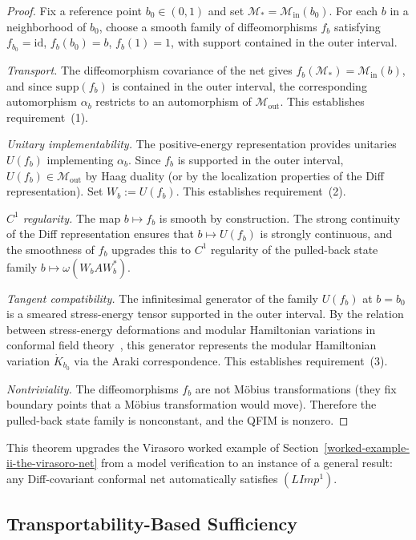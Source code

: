 \documentclass[12pt]{article}
\theoremstyle{definition}
\theoremstyle{remark}
\begin{document}
\begin{proof}
Fix a reference point $b_0 \in (0,1)$ and set $\mathcal{M}_* = \mathcal{M}_{\mathrm{in}}(b_0)$. For each $b$ in a neighborhood of $b_0$, choose a smooth family of diffeomorphisms $f_b$ satisfying $f_{b_0} = \mathrm{id}$, $f_b(b_0) = b$, $f_b(1) = 1$, with support contained in the outer interval.

\emph{Transport.} The diffeomorphism covariance of the net gives $f_b(\mathcal{M}_*) = \mathcal{M}_{\mathrm{in}}(b)$, and since $\mathrm{supp}(f_b)$ is contained in the outer interval, the corresponding automorphism $\alpha_b$ restricts to an automorphism of $\mathcal{M}_{\mathrm{out}}$. This establishes requirement~(1).

\emph{Unitary implementability.} The positive-energy representation provides unitaries $U(f_b)$ implementing $\alpha_b$. Since $f_b$ is supported in the outer interval, $U(f_b) \in \mathcal{M}_{\mathrm{out}}$ by Haag duality (or by the localization properties of the Diff representation). Set $W_b := U(f_b)$. This establishes requirement~(2).

\emph{$C^1$ regularity.} The map $b \mapsto f_b$ is smooth by construction. The strong continuity of the Diff representation ensures that $b \mapsto U(f_b)$ is strongly continuous, and the smoothness of $f_b$ upgrades this to $C^1$ regularity of the pulled-back state family $b \mapsto \omega(W_b A W_b^*)$.

\emph{Tangent compatibility.} The infinitesimal generator of the family $U(f_b)$ at $b = b_0$ is a smeared stress-energy tensor supported in the outer interval. By the relation between stress-energy deformations and modular Hamiltonian variations in conformal field theory~\cite{CasiniHuertaMyers2011}, this generator represents the modular Hamiltonian variation $\dot{K}_{b_0}$ via the Araki correspondence. This establishes requirement~(3).

\emph{Nontriviality.} The diffeomorphisms $f_b$ are not Möbius transformations (they fix boundary points that a Möbius transformation would move). Therefore the pulled-back state family is nonconstant, and the QFIM is nonzero.
\end{proof}

This theorem upgrades the Virasoro worked example of Section~\ref{worked-example-ii-the-virasoro-net} from a model verification to an instance of a general result: any Diff-covariant conformal net automatically satisfies $(LImp^1)$.

\subsection{Transportability-Based Sufficiency}\label{transportability-sufficiency}
\end{document}
